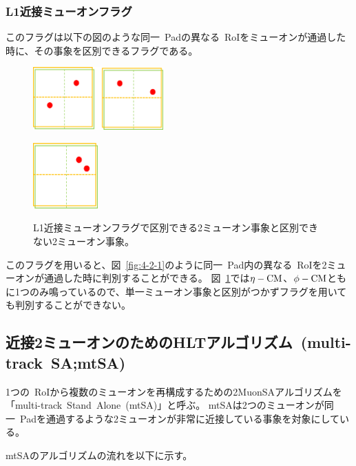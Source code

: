 \subsubsection{L1近接ミューオンフラグ}
このフラグは以下の図のような同一~Padの異なる~RoIをミューオンが通過した時に、その事象を区別できるフラグである。

\begin{figure}[H]
  \begin{minipage}[b]{0.5\linewidth}
      \centering
      \includegraphics[clip, width=5cm]{fig/4/isflaged.png}
      \label{fig:4-2-1}
  \end{minipage}
    \begin{minipage}[b]{0.45\linewidth}
      \centering
      \includegraphics[clip, width=2.5cm]{fig/4/isNotflaged.png}
      \label{fig:4-2-2}
  \end{minipage}
  \caption{L1近接ミューオンフラグで区別できる2ミューオン事象と区別できない2ミューオン事象。}
\end{figure}

このフラグを用いると、図~\ref{fig:4-2-1}のように同一~Pad内の異なる~RoIを2ミューオンが通過した時に判別することができる。
図~\ref{fig:4-2-2}では$\eta-\rm{CM}$、$\phi-\rm{CM}$ともに1つのみ鳴っているので、単一ミューオン事象と区別がつかずフラグを用いても判別することができない。

\subsection{近接2ミューオンのためのHLTアルゴリズム~(multi-track~SA;mtSA)}\label{chapter4-1-2}
1つの~RoIから複数のミューオンを再構成するための2MuonSAアルゴリズムを「multi-track~Stand~Alone~(mtSA)」と呼ぶ。
mtSAは2つのミューオンが同一~Padを通過するような2ミューオンが非常に近接している事象を対象にしている。

mtSAのアルゴリズムの流れを以下に示す。

